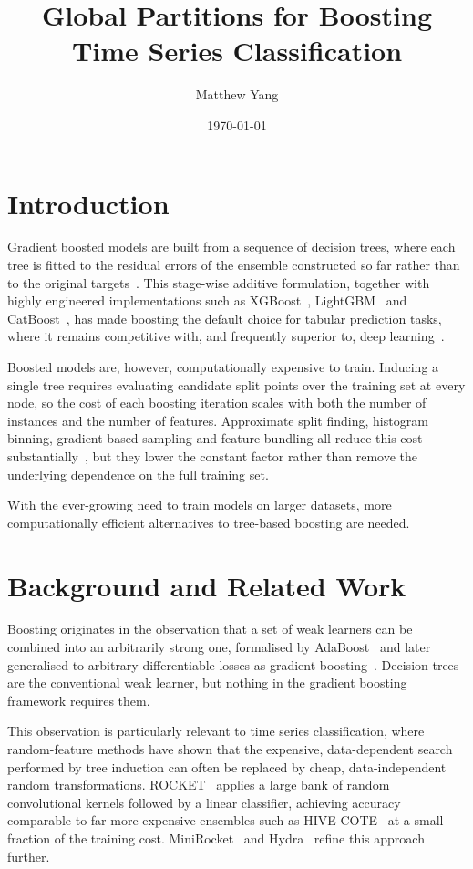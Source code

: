 \documentclass[a4paper, draft, 12pt]{article}
\author{Matthew Yang}
\title{Global Partitions for Boosting Time Series Classification}
\date{\today}
\begin{document}
\maketitle
\tableofcontents

\section{Introduction}

Gradient boosted models are built from a sequence of decision trees, where each
tree is fitted to the residual errors of the ensemble constructed so far rather
than to the original targets~\cite{friedman2001greedy}. This stage-wise
additive formulation, together with highly engineered implementations such as
XGBoost~\cite{chen2016xgboost}, LightGBM~\cite{ke2017lightgbm} and
CatBoost~\cite{prokhorenkova2018catboost}, has made boosting the default choice
for tabular prediction tasks, where it remains competitive with, and frequently
superior to, deep learning~\cite{shwartzziv2022tabular,grinsztajn2022why}.

Boosted models are, however, computationally expensive to train. Inducing a
single tree requires evaluating candidate split points over the training set at
every node, so the cost of each boosting iteration scales with both the number
of instances and the number of features. Approximate split finding, histogram
binning, gradient-based sampling and feature bundling all reduce this cost
substantially~\cite{chen2016xgboost,ke2017lightgbm,friedman2002stochastic}, but
they lower the constant factor rather than remove the underlying dependence on
the full training set.

With the ever-growing need to train models on larger datasets, more
computationally efficient alternatives to tree-based boosting are needed.

\section{Background and Related Work}

Boosting originates in the observation that a set of weak learners can be
combined into an arbitrarily strong one, formalised by
AdaBoost~\cite{freund1997decision} and later generalised to arbitrary
differentiable losses as gradient boosting~\cite{friedman2001greedy}. Decision
trees are the conventional weak learner, but nothing in the gradient boosting
framework requires them.

This observation is particularly relevant to time series classification, where
random-feature methods have shown that the expensive, data-dependent search
performed by tree induction can often be replaced by cheap, data-independent
random transformations. ROCKET~\cite{dempster2020rocket} applies a large bank
of random convolutional kernels followed by a linear classifier, achieving
accuracy comparable to far more expensive ensembles such as
HIVE-COTE~\cite{middlehurst2021hivecote2} at a small fraction of the training
cost. MiniRocket~\cite{dempster2021minirocket} and
Hydra~\cite{dempster2023hydra} refine this approach further.
\end{document}
